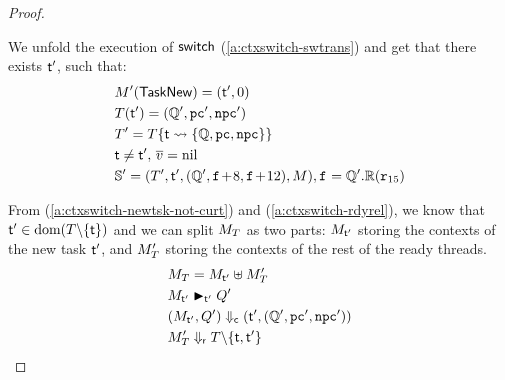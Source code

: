 \begin{proof}
\begin{enumerate}
        We unfold the execution of $\mathsf{switch}{}$ (\ref{a:ctxswitch-swtrans})
        and get that there exists $\textsf{t}'$, such that: 
        \begin{align}
            & M'(\mathsf{TaskNew}) = (\textsf{t}', 0) \\
            & T(\textsf{t}') = (\mathbb{Q}', \texttt{pc}', \texttt{npc}') \label{a:ctxswitch-newtsk} \\
            & T' = T\{ \textsf{t} \leadsto \{ \mathbb{Q}, \texttt{pc}, \texttt{npc} \} \}
                \\
            & \textsf{t} \neq \textsf{t}', \, \overline{v} = \text{nil} \label{a:ctxswitch-newtsk-not-curt} \\
            & \mathbb{S}' = (T', \textsf{t}', (\mathbb{Q}', \texttt{f}_{}\!+\!8, \texttt{f}_{}\!+\!12), 
                M{}), \texttt{f}_{} = \mathbb{Q}'.\mathbb{R}(\texttt{r}_{15}) 
        \end{align} 
    \end{enumerate} 

    From (\ref{a:ctxswitch-newtsk-not-curt}) and 
    (\ref{a:ctxswitch-rdyrel}), we know that $\textsf{t}' \in \text{dom}(T\backslash\{\textsf{t}\})$ 
    and we can split $M_T$ as two parts: 
    $M_{\textsf{t}'}$ storing the contexts of the new task $\textsf{t}'$, 
    and $M_T'$ storing the contexts of the rest of the ready threads. 
    \begin{align}
        & M_T = M_{\textsf{t}'}\uplus M_{T}' \\
        & {M_{\textsf{t}'}} \blacktriangleright_{\textsf{t}'} {Q'} \\
        & {(M_{\textsf{t}'}, Q')} \Downarrow_{\textsf{c}} {(\textsf{t}', (\mathbb{Q}', \texttt{pc}', \texttt{npc}'))} \\
        & {M_T'} \Downarrow_{\textsf{r}} {T\backslash\{\textsf{t}, \textsf{t}'\}}
    \end{align}


\end{proof}
